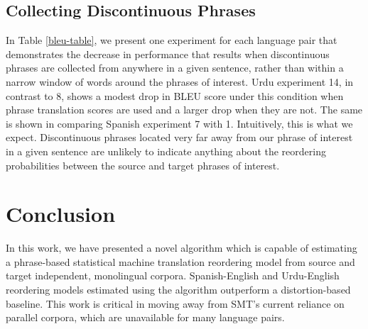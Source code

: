\documentclass[11pt,letterpaper]{article}
\begin{document}
\subsection{Collecting Discontinuous Phrases}
In Table \ref{bleu-table}, we present one experiment for each language pair that demonstrates the decrease in performance that results when discontinuous phrases are collected from anywhere in a given sentence, rather than within a narrow window of words around the phrases of interest. Urdu experiment 14, in contrast to 8, shows a modest drop in BLEU score under this condition when phrase translation scores are used and a larger drop when they are not. The same is shown in comparing Spanish experiment 7 with 1. Intuitively, this is what we expect. Discontinuous phrases located very far away from our phrase of interest in a given sentence are unlikely to indicate anything about the reordering probabilities between the source and target phrases of interest.


\section{Conclusion}
In this work, we have presented a novel algorithm which is capable of estimating a phrase-based statistical machine translation reordering model from source and target independent, monolingual corpora. Spanish-English and Urdu-English reordering models estimated using the algorithm outperform a distortion-based baseline. This work is critical in moving away from SMT's current reliance on parallel corpora, which are unavailable for many language pairs.





\end{document}
